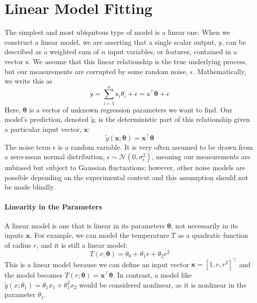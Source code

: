 \section{Linear Model Fitting}
The simplest and most ubiquitous type of model is a linear one. When we construct a linear model, we are asserting that a single scalar output, $\mathsf{y}$, can be described as a weighted sum of $n$ input variables, or features, contained in a vector $\bm{\mathsf{x}}$. We assume that this linear relationship is the true underlying process, but our measurements are corrupted by some random noise, $\mathsf{\epsilon}$. Mathematically, we write this as
\begin{equation}
    \mathsf{y} = \sum_{i=1}^n \mathsf{x}_i \theta_i + \mathsf{\epsilon} = \bm{\mathsf{x}}^\top \boldsymbol{\theta} + \mathsf{\epsilon}
    \label{eq:linear-model}
\end{equation}
Here, $\boldsymbol{\theta}$ is a vector of unknown regression parameters we want to find. Our model's prediction, denoted $\tilde{y}$, is the deterministic part of this relationship given a particular input vector, $\mathbf{x}$:
\begin{equation}
    \tilde{y}(\bm{x}; \boldsymbol{\theta}) = \bm{x}^\top \boldsymbol{\theta}
    \label{eq:linear-model-prediction}
\end{equation}
The noise term $\mathsf{\epsilon}$ is a random variable. It is very often assumed to be drawn from a zero-mean normal distribution, $\mathsf{\epsilon} \sim \mathcal{N}(0, \sigma^2_\epsilon)$, meaning our measurements are unbiased but subject to Gaussian fluctuations; however, other noise models are possible depending on the experimental context and this assumption should not be made blindly.


\paragraph*{Linearity in the Parameters}
A linear model is one that is linear in its parameters $\boldsymbol{\theta}$, not necessarily in its inputs $\bm{x}$. For example, we can model the temperature $T$ as a quadratic function of radius $r$, and it is still a linear model:
\begin{equation}
    T(r; \bm{\theta}) = \theta_0 + \theta_1 r + \theta_2 r^2
\end{equation}
This is a linear model because we can define an input vector $\mathbf{x} = [1, r, r^2]^\top$ and the model becomes $T(r; \bm{\theta}) = \mathbf{x}^\top \boldsymbol{\theta}$. In contrast, a model like $\tilde{y}(x; \theta_1) = \theta_1 x_1 + \theta_1^2 x_2$ would be considered nonlinear, as it is nonlinear in the parameter $\theta_1$.

